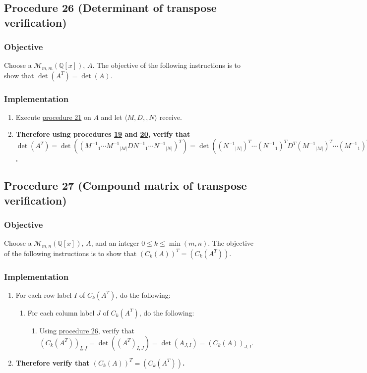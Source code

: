 \documentclass[twocolumn]{article}
\newcommand{\ul}[1]{\underline{#1}}
\begin{document}
		\subsection{Procedure 26 (Determinant of transpose verification)}\label{sec:procedure 26}
			\subsubsection{Objective}
				Choose a $\mathcal{M}_{m,m}(\mathbb{Q}[x])$, $A$. The objective of the following instructions is to show that $\det(A^T)=\det(A)$.
			\subsubsection{Implementation}
				\begin{enumerate}
					\item Execute \hyperref[sec:procedure 21]{procedure 21} on $A$ and let $\langle M,D,,N\rangle$ receive.
					\item \textbf{Therefore using procedures \hyperref[sec:procedure 23]{19} and \hyperref[sec:procedure 24]{20}, verify that $\det(A^T)=\det(({M^{-1}}_1\cdots {M^{-1}}_{\lvert M\rvert}D{N^{-1}}_1\cdots {N^{-1}}_{\lvert N\rvert})^T)=\det(({N^{-1}}_{\lvert N\rvert})^T\cdots({N^{-1}}_1)^TD^T({M^{-1}}_{\lvert M\rvert})^T\cdots({M^{-1}}_1)^T)=\det(D^T)=\det(D)=\det({M^{-1}}_1\cdots {M^{-1}}_{\lvert M\rvert}D{N^{-1}}_1\cdots {N^{-1}}_{\lvert N\rvert})=\det(A)$.}
				\end{enumerate}
		\subsection{Procedure 27 (Compound matrix of transpose verification)}\label{sec:procedure 27}
			\subsubsection{Objective}
				Choose a $\mathcal{M}_{m,n}(\mathbb{Q}[x])$, $A$, and an integer $0\le k\le\min(m,n)$. The objective of the following instructions is to show that $(C_k(A))^T=(C_k(A^T))$.
			\subsubsection{Implementation}
				\begin{enumerate}
					\item For each row label $I$ of $C_k(A^T)$, do the following:
					\begin{enumerate}
						\item For each column label $J$ of $C_k(A^T)$, do the following:
						\begin{enumerate}
							\item Using \hyperref[sec:procedure 26]{procedure 26}, verify that $(C_k(A^T))_{\ul{I},\ul{J}}=\det((A^T)_{I,J})=\det(A_{J,I})=(C_k(A))_{\ul{J},\ul{I}}$.
						\end{enumerate}
					\end{enumerate}
					\item \textbf{Therefore verify that $(C_k(A))^T=(C_k(A^T))$.}
				\end{enumerate}
\end{document}
